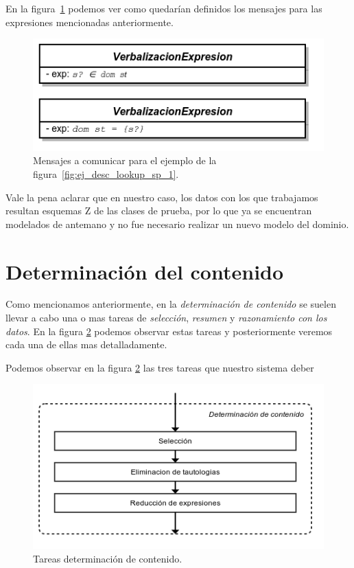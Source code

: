 En la figura~\ref{fig:ej_mensajes} podemos ver como quedarían definidos los mensajes para las expresiones mencionadas anteriormente.

\begin{figure}[H]
  	\centering
	\includegraphics[scale=0.4]{img/mensajes.png}
	\caption{Mensajes a comunicar para el ejemplo de la figura~\ref{fig:ej_desc_lookup_sp_1}.}
  	\label{fig:ej_mensajes}
\end{figure}

Vale la pena aclarar que en nuestro caso, los datos con los que trabajamos resultan esquemas Z de las clases de prueba, por lo que ya se encuentran modelados de antemano y no fue necesario realizar un nuevo modelo del dominio.
 

\section{Determinación del contenido}
\label{cap:determinacion_contenido}

Como mencionamos anteriormente, en la \emph{determinación de contenido} se suelen llevar a cabo una o mas tareas de \emph{selección}, \emph{resumen} y \emph{razonamiento con los datos}. En la figura                     \ref{fig:tareas_determinacion_contenido} podemos observar estas tareas y posteriormente veremos cada una de ellas mas detalladamente.

Podemos observar en la figura \ref{fig:tareas_determinacion_contenido} las tres tareas que nuestro sistema deber

\begin{figure}[H]
  	\centering
	\includegraphics[scale=0.4]{img/tareas_determinacion_contenido.png}
	\caption{Tareas determinación de contenido.}
  	\label{fig:tareas_determinacion_contenido}
\end{figure}



